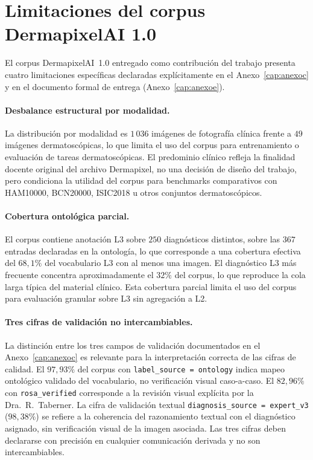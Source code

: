 \section{Limitaciones del corpus DermapixelAI 1.0}
\label{sec:lim-dermapixel}

El corpus DermapixelAI~1.0 entregado como contribución del trabajo
presenta cuatro limitaciones específicas declaradas explícitamente
en el Anexo~\ref{cap:anexoc} y en el documento formal de entrega
(Anexo~\ref{cap:anexoe}).

\paragraph{Desbalance estructural por modalidad.}
La distribución por modalidad es $1\,036$ imágenes de fotografía
clínica frente a $49$ imágenes dermatoscópicas, lo que limita
el uso del corpus para entrenamiento o evaluación de tareas
dermatoscópicas. El predominio clínico refleja la finalidad
docente original del archivo Dermapixel, no una decisión de
diseño del trabajo, pero condiciona la utilidad del corpus para
benchmarks comparativos con HAM10000, BCN20000, ISIC2018 u otros
conjuntos dermatoscópicos.

\paragraph{Cobertura ontológica parcial.}
El corpus contiene anotación L3 sobre $250$ diagnósticos
distintos, sobre las $367$ entradas declaradas en la
ontología, lo que corresponde a una cobertura efectiva del
$68{,}1\%$ del vocabulario L3 con al menos una imagen. El
diagnóstico L3 más frecuente concentra aproximadamente el
$32\%$ del corpus, lo que reproduce la cola larga típica del
material clínico. Esta cobertura parcial limita el uso del corpus
para evaluación granular sobre L3 sin agregación a L2.

\paragraph{Tres cifras de validación no intercambiables.}
La distinción entre los tres campos de validación documentados en
el Anexo~\ref{cap:anexoc} es relevante para la interpretación
correcta de las cifras de calidad. El $97{,}93\%$ del corpus
con \texttt{label\_source = ontology} indica mapeo ontológico
validado del vocabulario, no verificación visual caso-a-caso. El
$82{,}96\%$ con \texttt{rosa\_verified} corresponde a la revisión
visual explícita por la Dra.~R.~Taberner. La cifra de validación
textual \texttt{diagnosis\_source = expert\_v3} ($98{,}38\%$) se
refiere a la coherencia del razonamiento textual con el
diagnóstico asignado, sin verificación visual de la imagen
asociada. Las tres cifras deben declararse con precisión en
cualquier comunicación derivada y no son intercambiables.

